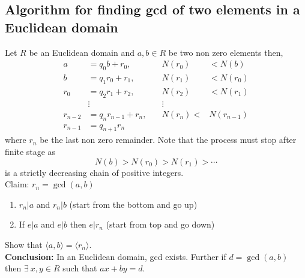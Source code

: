 \documentclass[11pt]{amsart}
\newcommand{\gen}[1]{\langle#1\rangle}
\begin{document}
\subsection{Algorithm for finding gcd of two elements in a Euclidean domain}
Let $R$ be an Euclidean domain and $a,b\in R$  be two non zero elements then, 
\begin{align*}
a&=q_0b+r_0,\quad &N(r_0)&<N(b)\\
b&=q_1r_0+r_1,\quad &N(r_1)&<N(r_0)\\
r_0&=q_2r_1+r_2,\quad &N(r_2)&<N(r_1)\\
&\vdots   &\vdots\\
r_{n-2}&=q_nr_{n-1}+r_n,\quad &N(r_n)<&N(r_{n-1})\\
r_{n-1}&=q_{n+1}r_n
\end{align*}
where $r_n$ be the last non zero remainder. Note that the process must stop after finite stage as $$N(b)>N(r_0)>N(r_1)>\cdots $$ is a strictly decreasing chain of positive integers.\\
Claim: $r_n=\gcd(a,b)$ \begin{enumerate}
\item $r_n|a$ and $r_n|b$ (start from the bottom and go up)
\item If $e|a$ and $e|b$ then $e|r_n$ (start from top and go down)
\end{enumerate}
Show that $\gen{a,b}=\gen{r_n}$.\\
\textbf{Conclusion:} In an Euclidean domain, gcd exists. Further if $d=\gcd (a,b)$ then $\exists~x,y\in R$ such that $ax+by=d.$
\end{document}

